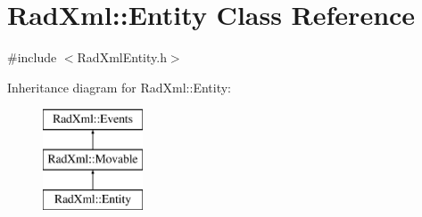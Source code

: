 \hypertarget{class_rad_xml_1_1_entity}{\section{Rad\-Xml\-:\-:Entity Class Reference}
\label{class_rad_xml_1_1_entity}
}


{\ttfamily \#include $<$Rad\-Xml\-Entity.\-h$>$}

Inheritance diagram for Rad\-Xml\-:\-:Entity\-:\begin{figure}[H]
\begin{center}
\leavevmode
\includegraphics[height=3.000000cm]{class_rad_xml_1_1_entity}
\end{center}
\end{figure}
